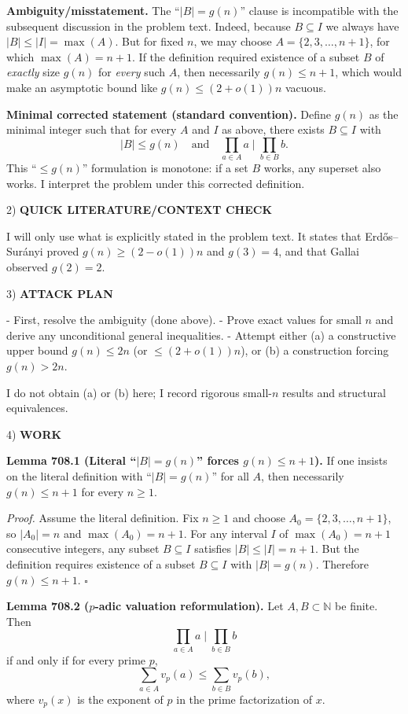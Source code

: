 \textbf{Ambiguity/misstatement.}
The ``$|B|=g(n)$'' clause is incompatible with the subsequent discussion in the problem text.
Indeed, because $B\subseteq I$ we always have $|B|\le |I|=\max(A)$.
But for fixed $n$, we may choose $A=\{2,3,\dots,n+1\}$, for which $\max(A)=n+1$.
If the definition required existence of a subset $B$ of \emph{exactly} size $g(n)$ for \emph{every} such $A$, then necessarily $g(n)\le n+1$, which would make an asymptotic bound like $g(n)\le (2+o(1))n$ vacuous.

\textbf{Minimal corrected statement (standard convention).}
Define $g(n)$ as the minimal integer such that for every $A$ and $I$ as above, there exists $B\subseteq I$ with
\[
|B|\le g(n)\quad\text{and}\quad \prod_{a\in A} a\mid \prod_{b\in B} b.
\]
This ``$\le g(n)$'' formulation is monotone: if a set $B$ works, any superset also works.
I interpret the problem under this corrected definition.

2) \textbf{QUICK LITERATURE/CONTEXT CHECK}

I will only use what is explicitly stated in the problem text.
It states that Erd\H{o}s--Sur\'anyi proved $g(n)\ge (2-o(1))n$ and $g(3)=4$, and that Gallai observed $g(2)=2$.

3) \textbf{ATTACK PLAN}

- First, resolve the ambiguity (done above).
- Prove exact values for small $n$ and derive any unconditional general inequalities.
- Attempt either (a) a constructive upper bound $g(n)\le 2n$ (or $\le (2+o(1))n$), or (b) a construction forcing $g(n)>2n$.

I do not obtain (a) or (b) here; I record rigorous small-$n$ results and structural equivalences.

4) \textbf{WORK}

\textbf{Lemma 708.1 (Literal ``$|B|=g(n)$'' forces $g(n)\le n+1$).}
If one insists on the literal definition with ``$|B|=g(n)$'' for all $A$, then necessarily $g(n)\le n+1$ for every $n\ge 1$.

\textit{Proof.}
Assume the literal definition.
Fix $n\ge 1$ and choose $A_0=\{2,3,\dots,n+1\}$, so $|A_0|=n$ and $\max(A_0)=n+1$.
For any interval $I$ of $\max(A_0)=n+1$ consecutive integers, any subset $B\subseteq I$ satisfies $|B|\le |I|=n+1$.
But the definition requires existence of a subset $B\subseteq I$ with $|B|=g(n)$.
Therefore $g(n)\le n+1$.
\hfill$\square$

\textbf{Lemma 708.2 ($p$-adic valuation reformulation).}
Let $A,B\subset\mathbb{N}$ be finite. Then
\[
\prod_{a\in A} a\mid \prod_{b\in B} b
\]
if and only if for every prime $p$,
\[
\sum_{a\in A} v_p(a)\le \sum_{b\in B} v_p(b),
\]
where $v_p(x)$ is the exponent of $p$ in the prime factorization of $x$.

